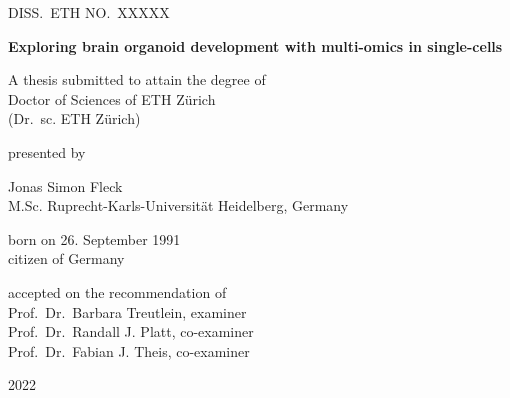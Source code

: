 \begin{titlepage}
\centering

{DISS.\ ETH NO.\ XXXXX}\\

\vspace{2cm}

{\bfseries\sffamily\LARGE
Exploring brain organoid development with multi-omics in single-cells
}

\vspace{2cm}

{\large A thesis submitted to attain the degree of}\\
{\sc \large Doctor of Sciences} {\large of} {\sc \large ETH Zürich}\\
{\large(Dr.\ sc. ETH Zürich)}\\


\vspace{1cm}

{\large presented by}\\

\vspace{0.3cm}

{\sc \large Jonas Simon Fleck}\\
{\large M.Sc. Ruprecht-Karls-Universität Heidelberg, Germany\\}

\vspace{1cm}

{\large 
born on 26. September 1991\\
citizen of Germany\\
}

\vspace{2cm}

{\large
accepted on the recommendation of\\
Prof.\ Dr.\ Barbara Treutlein, examiner\\
Prof.\ Dr.\ Randall J. Platt, co-examiner\\
Prof.\ Dr.\ Fabian J. Theis, co-examiner\\
}

\vspace{2cm}

{\large
2022
}
	
\end{titlepage}